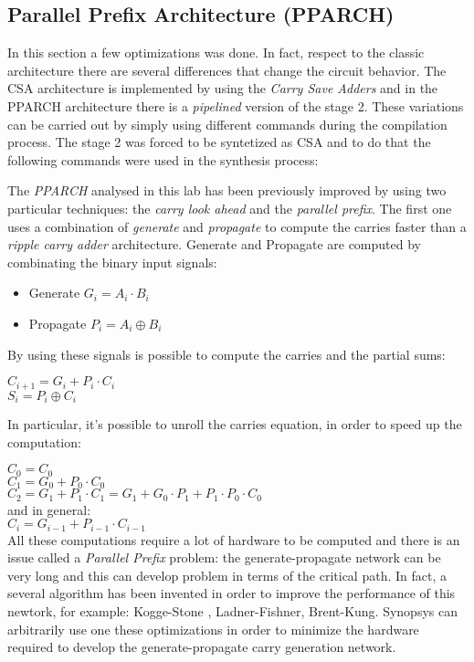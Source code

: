 \subsection{Parallel Prefix Architecture (PPARCH)}
In this section a few optimizations was done. In fact, respect to the classic architecture there are several differences that change the circuit behavior. The CSA architecture is implemented by using the \textit{Carry Save Adders} and in the PPARCH architecture there is a \textit{pipelined} version of the stage 2. These variations can be carried out by simply using different commands during the compilation process. The stage 2 was forced to be syntetized as CSA and to do that the following commands were used in the synthesis process:


The \textit{PPARCH} analysed in this lab has been previously improved by using two particular techniques: the \textit{carry look ahead} and the \textit{parallel prefix}. The first one uses a combination of \textit{generate} and \textit{propagate} to compute the carries faster than a \textit{ripple carry adder} architecture. Generate and Propagate are computed by combinating the binary input signals:
\begin{itemize} 
\item Generate $G_i = A_i \cdot B_i$
\item Propagate $P_i = A_i \oplus B_i$
\end{itemize}
By using these signals is possible to compute the carries and the partial sums:
\begin{center}
$C_{i+1} = G_i + P_i \cdot C_i$ \\
$S_i = P_i \oplus C_i $
\end{center}
In particular, it's possible to unroll the carries equation, in order to speed up the computation:

\noindent
$C_0 = C_0$ \\
$C_1 = G_0 + P_0 \cdot C_0$\\
$C_2 = G_1 + P_1 \cdot C_1 = G_1 + G_0 \cdot P_1  + P_1 \cdot P_0 \cdot C_0$\\
and in general: \\
$C_i = G_{i-1} + P_{i-1} \cdot C_{i-1}$\\
\noindent
All these computations require a lot of hardware to be computed and there is an issue called a \textit{Parallel Prefix} problem: the generate-propagate network can be very long and this can develop problem in terms of the critical path. In fact, a several algorithm has been invented in order to improve the performance of this newtork, for example: Kogge-Stone , Ladner-Fishner, Brent-Kung. Synopsys can arbitrarily use one these optimizations in order to minimize the hardware required to develop the generate-propagate carry generation network.
